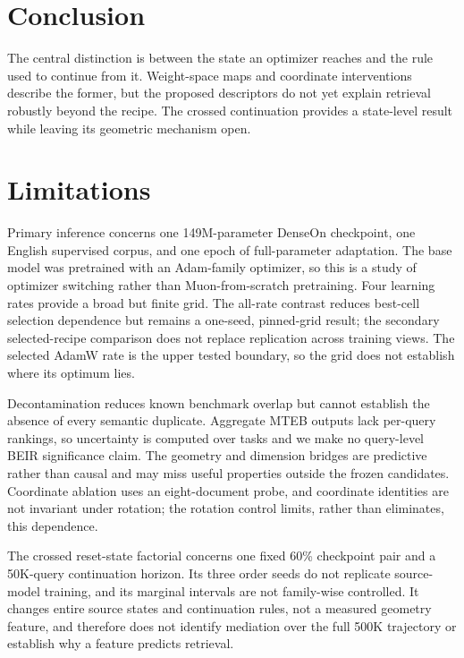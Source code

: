 \documentclass[11pt]{article}
\begin{document}
\FloatBarrier

\section{Conclusion}

\CorrectedConclusionFinding

\DimensionConclusionFinding

\StateOperatorConclusionFinding

The central distinction is between the state an optimizer reaches and the rule used to continue
from it. Weight-space maps and coordinate interventions describe the former, but the proposed
descriptors do not yet explain retrieval robustly beyond the recipe. The crossed continuation
provides a state-level result while leaving its geometric mechanism open.

\label{paper-main-end}

\section{Limitations}

Primary inference concerns one 149M-parameter DenseOn checkpoint, one English supervised corpus,
and one epoch of full-parameter adaptation. The base model was pretrained with an Adam-family
optimizer, so this is a study of optimizer switching rather than Muon-from-scratch pretraining.
Four learning rates provide a broad but finite grid. The all-rate contrast reduces best-cell
selection dependence but remains a one-seed, pinned-grid result; the secondary selected-recipe
comparison does not replace replication across training views. The selected AdamW rate is the
upper tested boundary, so the grid does not establish where its optimum lies.

Decontamination reduces known benchmark overlap but cannot establish the absence of every semantic
duplicate. Aggregate MTEB outputs lack per-query rankings, so uncertainty is computed over tasks and
we make no query-level BEIR significance claim. The geometry and dimension bridges are predictive
rather than causal and may miss useful properties outside the frozen candidates. Coordinate
ablation uses an eight-document probe, and coordinate identities are not invariant under rotation;
the rotation control limits, rather than eliminates, this dependence.

The crossed reset-state factorial concerns one fixed 60\% checkpoint pair and a 50K-query
continuation horizon. Its three order seeds do not replicate source-model training, and its marginal
intervals are not family-wise controlled. It changes entire source states and continuation rules,
not a measured geometry feature, and therefore does not identify mediation over the full 500K
trajectory or establish why a feature predicts retrieval.
\end{document}
